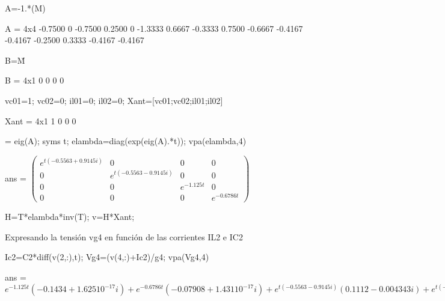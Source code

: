 \documentclass[10pt,a4paper]{article} %
\begin{document}
	\begin{matlabcode}
	A=-1.*(M\N)
	\end{matlabcode}
	\begin{matlaboutput}
	A = 4x4    
	-0.7500         0   -0.7500    0.2500
	0   -1.3333    0.6667   -0.3333
	0.7500   -0.6667   -0.4167   -0.4167
	-0.2500    0.3333   -0.4167   -0.4167
	
	\end{matlaboutput}
	\begin{matlabcode}
	B=M\u
	\end{matlabcode}
	\begin{matlaboutput}
	B = 4x1    
	0
	0
	0
	0
	
	\end{matlaboutput}
	\begin{matlabcode}
	vc01=1;
	vc02=0;
	il01=0;
	il02=0;
	Xant=[vc01;vc02;il01;il02]
	\end{matlabcode}
	\begin{matlaboutput}
	Xant = 4x1    
	1
	0
	0
	0
	
	\end{matlaboutput}
	\begin{matlabcode}
	[T, lambda] = eig(A);
	syms t;
	elambda=diag(exp(eig(A).*t));
	vpa(elambda,4)
	\end{matlabcode}
	\begin{matlabsymbolicoutput}
	ans = 
	$\displaystyle \left(\begin{array}{cccc}
	e^{t {\left(-0.5563+0.9145 i\right)}}  & 0 & 0 & 0\\
	0 & e^{t {\left(-0.5563-0.9145 i\right)}}  & 0 & 0\\
	0 & 0 & e^{-1.125 t}  & 0\\
	0 & 0 & 0 & e^{-0.6786 t} 
	\end{array}\right)$
	\end{matlabsymbolicoutput}
	\begin{matlabcode}
	H=T*elambda*inv(T);
	v=H*Xant;
	\end{matlabcode}
	
	
	\begin{par}
	\begin{flushleft}
	Expresando la tensión vg4 en función de las corrientes IL2 e IC2
	\end{flushleft}
	\end{par}
	
	\begin{matlabcode}
	Ic2=C2*diff(v(2,:),t);
	Vg4=(v(4,:)+Ic2)/g4;
	vpa(Vg4,4)
	\end{matlabcode}
	\begin{matlabsymbolicoutput}
	ans = 
	$\displaystyle e^{-1.125 t}  {\left(-0.1434+1.625 {10}^{-17}  i\right)}+e^{-0.6786 t}  {\left(-0.07908+1.431 {10}^{-17}  i\right)}+e^{t {\left(-0.5563-0.9145 i\right)}}  {\left(0.1112-0.004343 i\right)}+e^{t {\left(-0.5563+0.9145 i\right)}}  {\left(0.1112+0.004343 i\right)}$
	\end{matlabsymbolicoutput}
	
\end{document}

